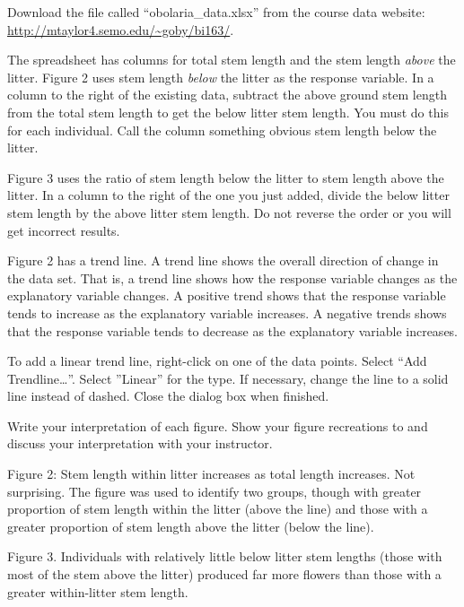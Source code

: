 \documentclass[12pt, hidelinks]{exam}
\newenvironment{AnswerPage}[1]
    {\begin{minipage}[t][#1]{0.92\textwidth}%
    \begin{solution}}
    {\end{solution}\end{minipage}
    \vspace{\stretch{1}}}
\newlength{\basespace}
\begin{document}
\begin{questions}
Download the file called “obolaria\_data.xlsx” from the course data website:\\ \url{http://mtaylor4.semo.edu/~goby/bi163/}.\bigskip


The spreadsheet has columns for total stem length and the stem length \emph{above} the litter. Figure 2 uses stem length \emph{below} the litter as the response variable. In a column to the right of the existing data, subtract the above ground stem length from the total stem length to get the below litter stem length. You must do this for each individual. Call the column something obvious stem length below the litter.


Figure 3 uses the ratio of stem length below the litter to stem length above the litter. In a column to the right of the one you just added, divide the below litter stem length by the above litter stem length. Do not reverse the order or you will get incorrect results.


Figure 2 has a trend line. A trend line shows the overall direction of change in the data set. That is, a trend line shows how the response variable changes as the explanatory variable changes. A positive trend shows that the response variable tends to increase as the explanatory variable increases. A negative trends shows that the response variable tends to decrease as the explanatory variable increases.

To add a linear trend line, right-click on one of the data points. Select “Add Trendline\dots”. Select ”Linear” for the type. If necessary, change the line to a solid line instead of dashed. Close the dialog box when finished.

\question[Checkout]
Write your interpretation of each figure. Show your figure recreations to and discuss your interpretation with your instructor.

\begin{AnswerPage}{2\basespace}
	Figure 2: Stem length within litter increases as total length increases. Not surprising. The figure was used to identify two groups, though with greater proportion of stem length within the litter (above the line) and those with a greater proportion of stem length above the litter (below the line).\bigskip
	
	Figure 3. Individuals with relatively little below litter stem lengths (those with most of the stem above the litter) produced far more flowers than those with a greater within-litter stem length.
\end{AnswerPage}


\end{questions}
\end{document}

